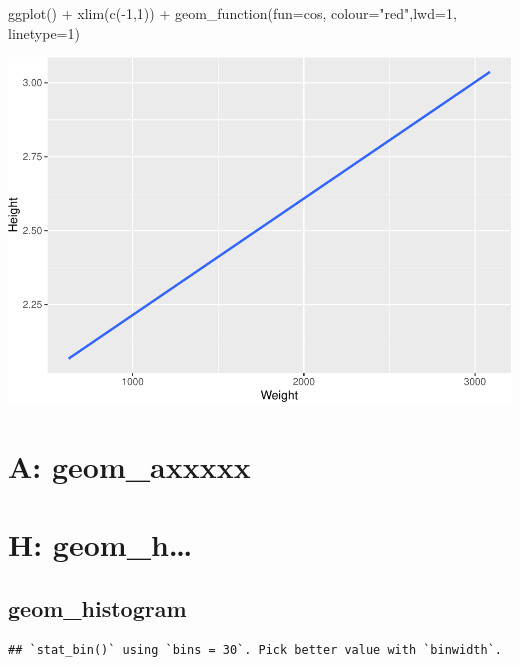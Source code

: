 \documentclass[
]{book}
\newenvironment{Shaded}{\begin{snugshade}}{\end{snugshade}}
\newcommand{\AttributeTok}[1]{\textcolor[rgb]{0.77,0.63,0.00}{#1}}
\newcommand{\DecValTok}[1]{\textcolor[rgb]{0.00,0.00,0.81}{#1}}
\newcommand{\FunctionTok}[1]{\textcolor[rgb]{0.00,0.00,0.00}{#1}}
\newcommand{\NormalTok}[1]{#1}
\newcommand{\SpecialCharTok}[1]{\textcolor[rgb]{0.00,0.00,0.00}{#1}}
\newcommand{\StringTok}[1]{\textcolor[rgb]{0.31,0.60,0.02}{#1}}
\begin{document}
\begin{Shaded}
\begin{Highlighting}[]
\FunctionTok{ggplot}\NormalTok{() }\SpecialCharTok{+} \FunctionTok{xlim}\NormalTok{(}\FunctionTok{c}\NormalTok{(}\SpecialCharTok{{-}}\DecValTok{1}\NormalTok{,}\DecValTok{1}\NormalTok{)) }\SpecialCharTok{+} \FunctionTok{geom\_function}\NormalTok{(}\AttributeTok{fun=}\NormalTok{cos, }\AttributeTok{colour=}\StringTok{"red"}\NormalTok{,}\AttributeTok{lwd=}\DecValTok{1}\NormalTok{, }\AttributeTok{linetype=}\DecValTok{1}\NormalTok{)}
\end{Highlighting}
\end{Shaded}

\includegraphics{Data-Visualisation-geom-Encyclopedia_files/figure-latex/unnamed-chunk-42-1.pdf}

\hypertarget{a-geom_axxxxx}{%
\chapter{A: geom\_axxxxx}\label{a-geom_axxxxx}}

\hypertarget{h-geom_h}{%
\chapter{H: geom\_h\ldots{}}\label{h-geom_h}}

\hypertarget{histogram}{%
\section{geom\_histogram}\label{histogram}}

\begin{verbatim}
## `stat_bin()` using `bins = 30`. Pick better value with `binwidth`.
\end{verbatim}
\end{document}
